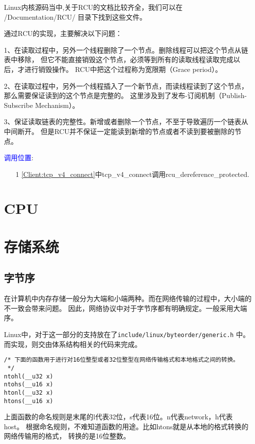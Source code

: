 			Linux内核源码当中,关于RCU的文档比较齐全，我们可以在 /Documentation/RCU/ 目录下找到这些文件。

			通过RCU的实现，主要解决以下问题：

       			1、在读取过程中，另外一个线程删除了一个节点。删除线程可以把这个节点从链表中移除，
					但它不能直接销毁这个节点，必须等到所有的读取线程读取完成以后，才进行销毁操作。
					RCU中把这个过程称为宽限期（Grace period）。

       			2、在读取过程中，另外一个线程插入了一个新节点，而读线程读到了这个节点，那么需要保证读到的这个节点是完整的。
					这里涉及到了发布-订阅机制（Publish-Subscribe Mechanism）。

       			3、保证读取链表的完整性。新增或者删除一个节点，不至于导致遍历一个链表从中间断开。
					但是RCU并不保证一定能读到新增的节点或者不读到要被删除的节点。

			\textcolor{blue}{调用位置}:
\begin{enumerate}
\item[1]	\ref{Client:tcp_v4_connect}中tcp\_v4\_connect调用rcu\_dereference\_protected.
\end{enumerate}
	\section{CPU}
		
	\section{存储系统}
		\subsection{字节序}
			在计算机中内存存储一般分为大端和小端两种。而在网络传输的过程中，大小端的不一致会带来问题。
因此，网络协议中对于字节序都有明确规定。一般采用大端序。

			Linux中，对于这一部分的支持放在了\texttt{include/linux/byteorder/generic.h}
中。而实现，则交由体系结构相关的代码来完成。

\begin{verbatim}
/* 下面的函数用于进行对16位整型或者32位整型在网络传输格式和本地格式之间的转换。
 */
ntohl(__u32 x)
ntohs(__u16 x)
htonl(__u32 x)
htons(__u16 x)
\end{verbatim}

			上面函数的命名规则是末尾的l代表32位，s代表16位。n代表network，h代表host。
根据命名规则，不难知道函数的用途。比如htons就是从本地的格式转换的网络传输用的格式，
转换的是16位整数。
